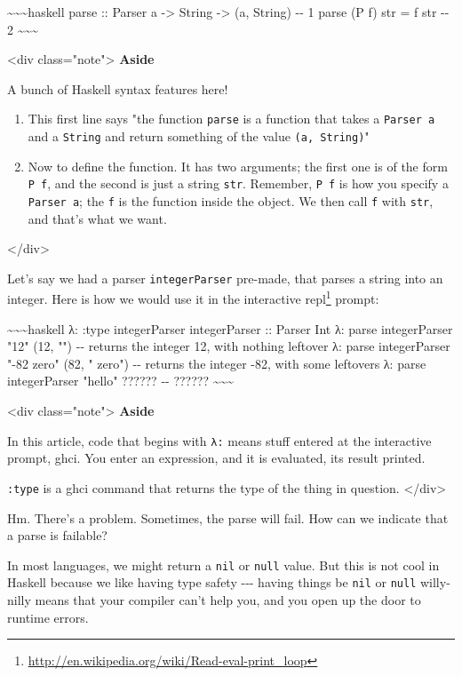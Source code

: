 \documentclass[]{article}
\renewcommand{\href}[2]{#2\footnote{\url{#1}}}
\begin{document}
\textasciitilde{}\textasciitilde{}\textasciitilde{}haskell parse :: Parser a
-\textgreater{} String -\textgreater{} (a, String) -\/- 1 parse (P f) str = f
str -\/- 2 \textasciitilde{}\textasciitilde{}\textasciitilde{}

\textless{}div class="note"\textgreater{} \textbf{Aside}

A bunch of Haskell syntax features here!

\begin{enumerate}
\item
  This first line says "the function \texttt{parse} is a function that takes a
  \texttt{Parser\ a} and a \texttt{String} and return something of the value
  \texttt{(a,\ String)}"
\item
  Now to define the function. It has two arguments; the first one is of the form
  \texttt{P\ f}, and the second is just a string \texttt{str}. Remember,
  \texttt{P\ f} is how you specify a \texttt{Parser\ a}; the \texttt{f} is the
  function inside the object. We then call \texttt{f} with \texttt{str}, and
  that's what we want.
\end{enumerate}

\textless{}/div\textgreater{}

Let's say we had a parser \texttt{integerParser} pre-made, that parses a string
into an integer. Here is how we would use it in the interactive
\href{http://en.wikipedia.org/wiki/Read-eval-print_loop}{repl} prompt:

\textasciitilde{}\textasciitilde{}\textasciitilde{}haskell λ: :type
integerParser integerParser :: Parser Int λ: parse integerParser "12" (12, "")
-\/- returns the integer 12, with nothing leftover λ: parse integerParser "-82
zero" (82, " zero") -\/- returns the integer -82, with some leftovers λ: parse
integerParser "hello" ?????? -\/- ??????
\textasciitilde{}\textasciitilde{}\textasciitilde{}

\textless{}div class="note"\textgreater{} \textbf{Aside}

In this article, code that begins with \texttt{λ:} means stuff entered at the
interactive prompt, ghci. You enter an expression, and it is evaluated, its
result printed.

\texttt{:type} is a ghci command that returns the type of the thing in question.
\textless{}/div\textgreater{}

Hm. There's a problem. Sometimes, the parse will fail. How can we indicate that
a parse is failable?

In most languages, we might return a \texttt{nil} or \texttt{null} value. But
this is not cool in Haskell because we like having type safety -\/-\/- having
things be \texttt{nil} or \texttt{null} willy-nilly means that your compiler
can't help you, and you open up the door to runtime errors.
\end{document}
